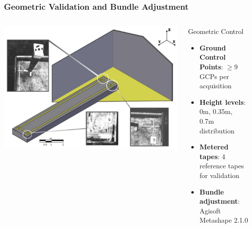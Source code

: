 \documentclass[aspectratio=43]{beamer}
\begin{document}
\begin{frame}
    \frametitle{Geometric Validation and Bundle Adjustment}
    
    \begin{columns}
        \begin{column}{0.5\textwidth}
            \includegraphics[width=\textwidth]{Imgs/agronomy-14-00306-g005.png}
        \end{column}
        
        \begin{column}{0.5\textwidth}
            \begin{block}{Geometric Control}
                \scriptsize
                \begin{itemize}
                    \item \textbf{Ground Control Points}: \ensuremath{\geq}9 GCPs per acquisition
                    \item \textbf{Height levels}: 0m, 0.35m, 0.7m distribution
                    \item \textbf{Metered tapes}: 4 reference tapes for validation
                    \item \textbf{Bundle adjustment}: Agisoft Metashape 2.1.0
                \end{itemize}
            \end{block}
            

\end{column}
\end{columns}
\end{frame}
\end{document}
